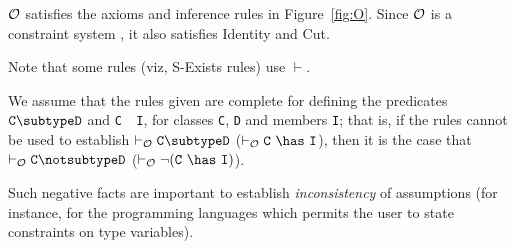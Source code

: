 $\cal O$ satisfies the axioms and inference rules in
Figure~\ref{fig:O}. Since $\cal O$ is a constraint system \cite{cccc},
it also satisfies Identity and Cut.

Note that some rules (viz, {\sc S-Exists} rules)
use $\vdash$. 

We assume that the rules given are complete for
defining the predicates $\tt C \subtype D$ and {\tt C\ \has\ I}, for
classes {\tt C}, {\tt D} and members {\tt I}; that is, if the rules
cannot be used to establish $\tt \vdash_{\cal O} C \subtype D$ ($\tt
\vdash_{\cal O} C\ \has\ I$), then it is the case that $\tt
\vdash_{\cal O} C \notsubtype D$ ($\tt \vdash_{\cal O} \neg (C\ \has\
I)$).

Such negative facts are important to establish {\em inconsistency} of
assumptions (for instance, for the programming languages which permits
the user to state constraints on type variables).  

